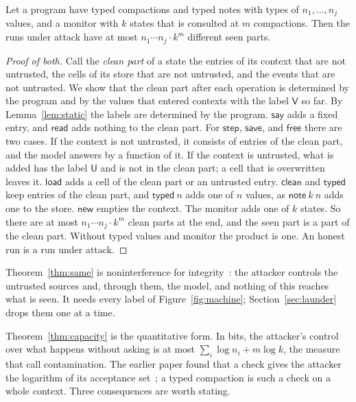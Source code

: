 \documentclass[acmsmall,nonacm,screen]{acmart}
\newcommand{\kw}[1]{\mathsf{#1}}
\newcommand{\V}{\kw{V}}
\newcommand{\U}{\kw{U}}
\newcommand{\op}[1]{\kw{#1}}
\begin{document}
\begin{theorem}[Capacity]
\label{thm:capacity}
Let a program have typed compactions and typed notes with types of $n_1, \ldots, n_j$ values,
and a monitor with $k$ states that is consulted at $m$ compactions. Then the runs under attack
have at most $n_1 \cdots n_j \cdot k^m$ different seen parts.
\end{theorem}

\begin{proof}[Proof of both]
Call the \emph{clean part} of a state the entries of its context that are not untrusted, the
cells of its store that are not untrusted, and the events that are not untrusted. We show
that the clean part after each operation is determined by the program and by the values
that entered contexts with the label $\V$ so far. By Lemma~\ref{lem:static} the labels are
determined by the program. $\op{say}$ adds a fixed entry, and $\op{read}$ adds nothing to the
clean part. For $\op{step}$, $\op{save}$, and $\op{free}$ there are two cases. If the context
is not untrusted, it consists of entries of the clean part, and the model answers by a
function of it. If the context is untrusted, what is added has the label $\U$ and is not in
the clean part; a cell that is overwritten leaves it. $\op{load}$ adds a cell of the clean
part or an untrusted entry. $\op{clean}$ and $\op{typed}$ keep entries of the clean part,
and $\op{typed}\ n$ adds one of $n$ values, as $\op{note}\ k\ n$ adds one to the store. $\op{new}$
empties the context. The monitor adds one of $k$ states. So there are
at most $n_1 \cdots n_j \cdot k^m$ clean parts at the end, and the seen part is a part of
the clean part. Without typed values and monitor the product is one. An honest run is a run
under attack.
\end{proof}

Theorem~\ref{thm:same} is noninterference for integrity~\cite{goguen1982}: the attacker
controls the untrusted sources and, through them, the model, and nothing of this reaches
what is seen. It needs every label of Figure~\ref{fig:machine}; Section~\ref{sec:launder}
drops them one at a time.

Theorem~\ref{thm:capacity} is the quantitative form. In bits, the attacker's control over
what happens without asking is at most $\sum_i \log n_i + m \log k$, the measure that
\citet{clarkson2010} call contamination. The earlier paper found that a check gives the
attacker the logarithm of its acceptance set~\cite{tpp7}; a typed compaction is such a check
on a whole context. Three consequences are worth stating.
\end{document}
